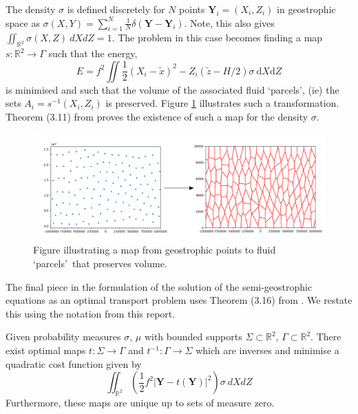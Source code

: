 \linebreak
The density $\sigma$ is defined discretely for $N$ points $\bm{Y}_i = \left(X_i,Z_i\right)$ in geostrophic space as $\sigma(X,Y) = \sum_{i=1}^{N}\frac{1}{N}\delta\left(\bm{Y}-\bm{Y}_i\right)$. Note, this also gives $	\iint_{\mathbb{R}^2} \sigma\left(X,Z\right) \ dXdZ = 1$. The problem in this case becomes finding a map $s: \mathbb{R}^2 \rightarrow \Gamma$ such that the energy,
\begin{equation}
E = f^2 \iint \frac{1}{2}\left(X_i-\tilde{x}\right)^2 - Z_i\left(\tilde{z} - H/2\right)\sigma \ \textrm{d}X\textrm{d}Z
\end{equation}
is minimised and such that the volume of the associated fluid \textquoteleft parcels\textquoteright, (ie) the sets $A_i = s^{-1}(X_i,Z_i)$ is preserved. Figure \ref{fig:gpointsmapping} illustrates such a transformation. Theorem (3.11) from \cite{Cullen2006a} proves the existence of such a map for the density $\sigma$.
\begin{figure}[h]
	\centering
	\includegraphics[width=\linewidth]{background/gpoints_mapping}
	\caption[Map from geostrophic points to fluid 'parcels']{Figure illustrating a map from geostrophic points to fluid \textquoteleft parcels\textquoteright \  that preserves volume.}
	\label{fig:gpointsmapping}
\end{figure}
The final piece in the formulation of the solution of the semi-geostrophic equations as an optimal transport problem uses Theorem (3.16) from \cite{Cullen2006a}. We restate this using the notation from this report.
\begin{theorem}
	Given probability measures $\sigma$, $\mu$ with bounded supports $\Sigma \subset \mathbb{R}^2$, $\Gamma \subset \mathbb{R}^2 $. There exist optimal maps $t: \Sigma \rightarrow \Gamma$ and $t^{-1}: \Gamma \rightarrow \Sigma$ which are inverses and minimise a quadratic cost function given by
	\begin{equation*}
		\iint_{\mathbb{R}^2} \left(\frac{1}{2}f^2|\bm{Y}-t(\bm{Y})|^2\right)\sigma \ dXdZ
	\end{equation*}
	Furthermore, these maps are unique up to sets of measure zero.
	\label{OTthm}
\end{theorem}

